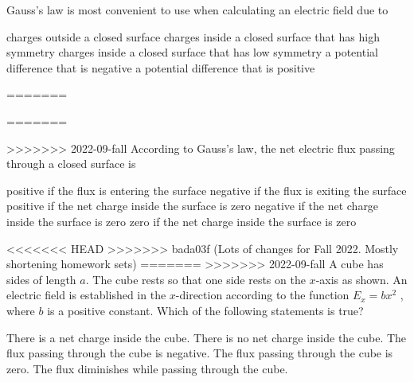 \documentclass{../../oss-apphys-exam}
\begin{document}
\begin{multicols*}{2}
\begin{questions}
    \question Gauss's law is most convenient to use when calculating an electric
    field due to
    \begin{choices}
      \choice charges outside a closed surface
      \choice charges inside a closed surface that has high symmetry
      \choice charges inside a closed surface that has low symmetry
      \choice a potential difference that is negative
      \choice a potential difference that is positive
    \end{choices}
    \columnbreak
    
=======
    \columnbreak
    
=======
    \columnbreak
    
>>>>>>> 2022-09-fall
    \question According to Gauss's law, the net electric flux passing through a
    closed surface is
    \begin{choices}
      \choice positive if the flux is entering the surface
      \choice negative if the flux is exiting the surface
      \choice positive if the net charge inside the surface is zero
      \choice negative if the net charge inside the surface is zero
      \choice zero if the net charge inside the surface is zero
    \end{choices}
    
    
<<<<<<< HEAD
>>>>>>> bada03f (Lots of changes for Fall 2022. Mostly shortening homework sets)
=======
>>>>>>> 2022-09-fall
    \question A cube has sides of length $a$. The cube rests so that one side
    rests on the $x$-axis as shown. An electric field is established in the
    $x$-direction according to the function $E_x=bx^2$ , where $b$ is a positive
    constant. Which of the following statements is true?
    \label{cube1}
    \begin{choices}
      \choice There is a net charge inside the cube.
      \choice There is no net charge inside the cube.
      \choice The flux passing through the cube is negative.
      \choice The flux passing through the cube is zero.
      \choice The flux diminishes while passing through the cube.
    \end{choices}
    \vspace{.7in}
    

\end{questions}
\end{multicols*}
\end{document}

